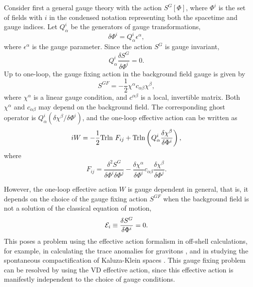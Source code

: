 \documentclass[a4paper,aps,preprint,groupedaddress,showpacs]{revtex4}
\begin{document}
Consider first a general gauge theory with the action
$S^{G}[\Phi]$, where $\Phi^{i}$ is the set of fields with 
$i$ in the condensed notation representing both the spacetime
and gauge indices. Let $Q^{i}_{\alpha}$ be the generators of
gauge transformations, 
\begin{equation}
\delta\Phi^{i}=Q^{i}_{\alpha}\epsilon^{\alpha},
\end{equation}
where $\epsilon^{\alpha}$ is the gauge parameter. Since the
action $S^{G}$ is gauge invariant,
\begin{equation}
Q^{i}_{\alpha}\frac{\delta S^{G}}{\delta\Phi^{i}}=0.
\label{gauge}
\end{equation}
Up to one-loop, the gauge fixing action in the background field
gauge is given by 
\begin{equation}
S^{GF}=-\frac{1}{2}\chi^{\alpha}c_{\alpha\beta}\chi^{\beta},
\end{equation}
where $\chi^{\alpha}$ is a linear gauge condition, and
$c^{\alpha\beta}$ is a local, invertible matrix. Both 
$\chi^{\alpha}$ and $c_{\alpha\beta}$ may depend on the
background field. The corresponding ghost operator is 
$Q^{i}_{\alpha}(\delta\chi^{\beta}/\delta\Phi^{i})$, and
the one-loop effective action can be written as
\begin{equation}
iW=-\frac{1}{2}{\rm Trln\ }F_{ij}+
{\rm Trln}\left(Q^{i}_{\alpha}
\frac{\delta\chi^{\beta}}{\delta\Phi^{i}}\right),
\label{EA}
\end{equation}
where 
\begin{equation}
F_{ij}=\frac{\delta^{2}S^{G}}{\delta\Phi^{i}\delta\Phi^{j}}-
\frac{\delta\chi^{\alpha}}{\delta\Phi^{i}}c_{\alpha\beta}
\frac{\delta\chi^{\beta}}{\delta\Phi^{j}}.
\end{equation}

However, the one-loop effective action $W$ is gauge dependent 
in general, that is, it depends on the choice of the gauge fixing
action $S^{GF}$ when the background field is not a solution of
the classical equation of motion,
\begin{equation}
{\cal E}_{i}\equiv\frac{\delta S^{G}}{\delta\Phi^{i}}=0.
\end{equation}
This poses a problem using the effective action
formalism in off-shell calculations, for example,
in calculating the trace anomalies for gravitons \cite{CK3}, and in studying
the spontaneous compactification of Kaluza-Klein spaces
\cite{HKLT}. 
This gauge fixing problem can be resolved by using 
the VD effective action, since this effective
action is manifestly independent to the choice 
of gauge conditions. 
\end{document}
